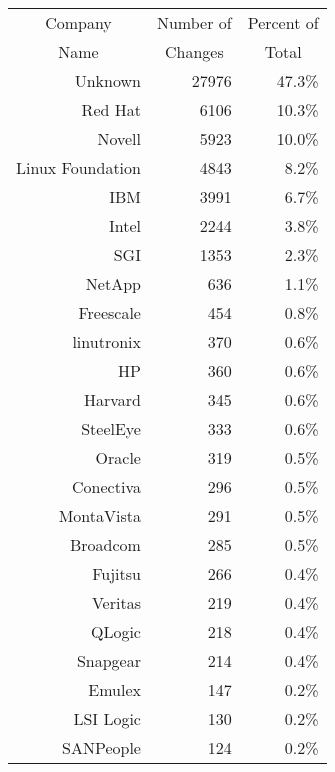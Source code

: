 \documentclass[final]{ols}
\begin{document}
\begin{table}[h!]%
\begin{center}
\begin{small}
\begin{tabular}{|r|r|r|}
\hline
\multicolumn{1}{|c|}{Company} & \multicolumn{1}{|c|}{Number of}  & \multicolumn{1}{|c|}{Percent of} \\
\multicolumn{1}{|c|}{Name}    & \multicolumn{1}{|c|}{Changes}    & \multicolumn{1}{|c|}{Total} \\
\hline
\hline
\rule[-0.1ex]{0pt}{2.5ex}Unknown                  & 27976 & 47.3\% \\
Red Hat                  &  6106 & 10.3\% \\
Novell                   &  5923 & 10.0\% \\
Linux Foundation         &  4843 & 8.2\%  \\
IBM                      &  3991 & 6.7\%  \\
Intel                    &  2244 & 3.8\%  \\
SGI                      &  1353 & 2.3\%  \\
NetApp                   &   636 & 1.1\%  \\
Freescale                &   454 & 0.8\%  \\
linutronix               &   370 & 0.6\%  \\
\hline
\rule[-0.1ex]{0pt}{2.5ex}HP                         & 360 & 0.6\% \\
Harvard                    & 345 & 0.6\% \\
SteelEye                   & 333 & 0.6\% \\
Oracle                     & 319 & 0.5\% \\
Conectiva                  & 296 & 0.5\% \\
MontaVista                 & 291 & 0.5\% \\
Broadcom                   & 285 & 0.5\% \\
Fujitsu                    & 266 & 0.4\% \\
Veritas                    & 219 & 0.4\% \\
QLogic                     & 218 & 0.4\% \\
\hline
\rule[-0.1ex]{0pt}{2.5ex}Snapgear                   & 214 & 0.4\% \\
Emulex                     & 147 & 0.2\% \\
LSI Logic                  & 130 & 0.2\% \\
SANPeople                  & 124 & 0.2\% \\

\end{tabular}
\end{small}
\end{center}
\end{table}
\end{document}
